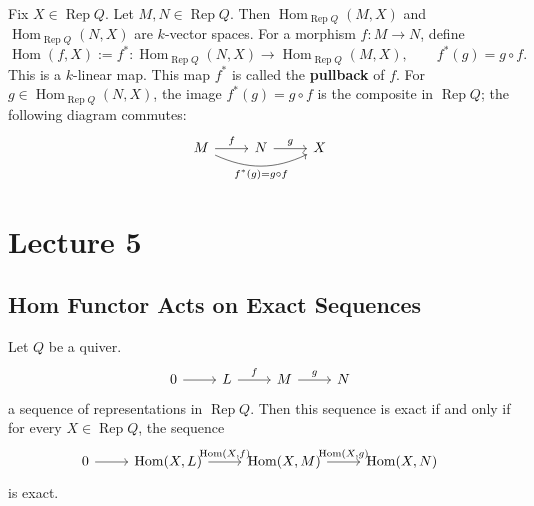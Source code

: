 \documentclass[11pt, a4paper]{report}
\begin{document}
\begin{example}
    Fix $X \in \operatorname{Rep}Q$. Let $M, N \in \operatorname{Rep}Q$. Then $\operatorname{Hom}_{\operatorname{Rep}Q}(M,X)$ and $\operatorname{Hom}_{\operatorname{Rep}Q}(N,X)$ are $k$-vector spaces. For a morphism $f: M \to N$, define
    \[
        \operatorname{Hom}(f,X):= f^*: \operatorname{Hom}_{\operatorname{Rep}Q}(N,X) \to \operatorname{Hom}_{\operatorname{Rep}Q}(M,X),
        \qquad
        f^*(g)= g \circ f.
    \]
    This is a $k$-linear map. This map $f^*$ is called the \textbf{pullback} of $f$. For $g \in \operatorname{Hom}_{\operatorname{Rep}Q}(N,X)$, the image $f^*(g) = g \circ f$ is the composite in $\operatorname{Rep}Q$; the following diagram commutes:
    \[
        \begin{tikzcd}
            M \arrow[r, "f"] \arrow[rr, "f^*(g)=g \circ f"', bend right=25] & N \arrow[r, "g"] & X
        \end{tikzcd}
    \]
\end{example}

\chapter{Lecture 5}

\section{Hom Functor Acts on Exact Sequences}

\begin{theorem}
    Let $Q$ be a quiver.
    \[
        \begin{tikzcd}
            0 \arrow[r] & L \arrow[r, "f"] & M \arrow[r, "g"] & N
        \end{tikzcd}
    \]
    a sequence of representations in $\operatorname{Rep}Q$. Then this sequence is exact if and only if for every $X \in \operatorname{Rep}Q$, the sequence
    \[
        \begin{tikzcd}
            0 \arrow[r] & {\operatorname{Hom}(X,L)} \arrow[r, "{\operatorname{Hom}(X,f)}"] & {\operatorname{Hom}(X,M)} \arrow[r, "{\operatorname{Hom}(X,g)}"] & {\operatorname{Hom}(X,N)}
        \end{tikzcd}
    \]
    is exact.
\end{theorem}
\end{document}
